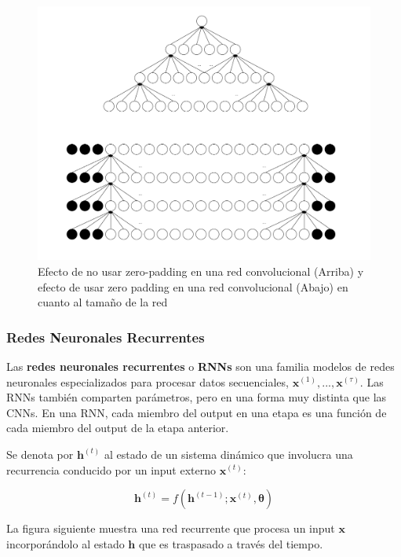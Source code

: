\begin{figure}[H]
\captionsetup{font=small,labelfont=small}
\caption{Efecto de no usar zero-padding en una red convolucional (Arriba) y efecto de usar zero padding en una red convolucional (Abajo) en cuanto al tama{\~{n}}o de la red}
\centering
\includegraphics[scale=.15]{img/padding.png}
\end{figure}

\subsubsection{Redes Neuronales Recurrentes}

Las \textbf{redes neuronales recurrentes} o \textbf{RNNs} son una familia modelos de redes neuronales especializados para procesar datos secuenciales, $\bm{x}^{(1)},...,\bm{x}^{(\tau)}$. Las RNNs tambi\'en comparten par\'ametros, pero en una forma muy distinta que las CNNs. En una RNN, cada miembro del output en una etapa es una funci\'on de cada miembro del output de la etapa anterior.

Se denota por $\bm{h}^{(t)}$ al estado de un sistema din\'amico que involucra una recurrencia conducido por un input externo $\bm{x}^{(t)}$:

\begin{equation}
\bm{h}^{(t)} = f(\bm{h}^{(t-1)}; \bm{x}^{(t)}, \bm{\theta})
\end{equation}

La figura siguiente muestra una red recurrente que procesa un input $\bm{x}$ incorpor\'andolo al estado $\bm{h}$ que es traspasado a trav\'es del tiempo.

